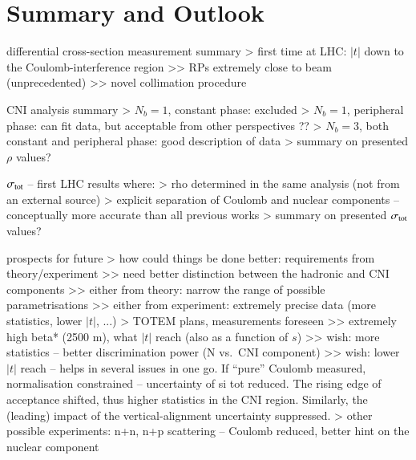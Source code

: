\section{Summary and Outlook}

\> differential cross-section measurement summary
\>> first time at LHC: $|t|$ down to the Coulomb-interference region
\>>> RPs extremely close to beam (unprecedented)
\>>> novel collimation procedure


\> CNI analysis summary
\>> $N_b=1$, constant phase: excluded
\>> $N_b=1$, peripheral phase: can fit data, but acceptable from other perspectives ??
\>> $N_b=3$, both constant and peripheral phase: good description of data
\>> summary on presented $\rho$ values?

\> $\sigma_{\rm tot}$ -- first LHC results where:
\>> rho determined in the same analysis (not from an external source)
\>> explicit separation of Coulomb and nuclear components -- conceptually more accurate than all previous works
\>> summary on presented $\sigma_{\rm tot}$ values?

\> prospects for future
\>> how could things be done better: requirements from theory/experiment
\>>> need better distinction between the hadronic and CNI components
\>>> either from theory: narrow the range of possible parametrisations
\>>> either from experiment: extremely precise data (more statistics, lower $|t|$, ...)
\>> TOTEM plans, measurements foreseen
\>>> extremely high beta* (2500 m), what $|t|$ reach (also as a function of $s$)
\>>> wish: more statistics -- better discrimination power (N vs.~CNI component)
\>>> wish: lower $|t|$ reach -- helps in several issues in one go. If ``pure'' Coulomb measured, normalisation constrained -- uncertainty of si tot reduced. The rising edge of acceptance shifted, thus higher statistics in the CNI region. Similarly, the (leading) impact of the vertical-alignment uncertainty suppressed.
\>> other possible experiments: n+n, n+p scattering -- Coulomb reduced, better hint on the nuclear component
